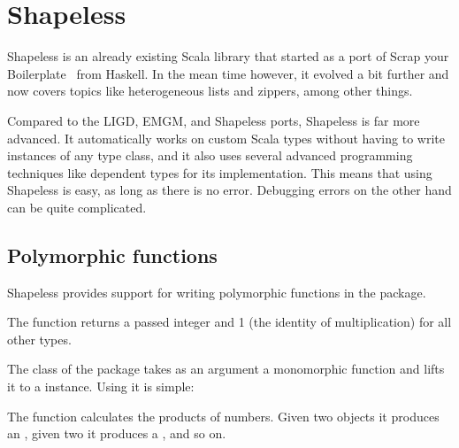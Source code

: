 \section{Shapeless}
\label{shapeless}

Shapeless is an already existing Scala library that started as a port of Scrap your
Boilerplate~\cite{DBLP:conf/tldi/LammelJ03} from Haskell. In the mean time however,
it evolved a bit further and now covers topics like heterogeneous lists and
zippers, among other things.

Compared to the LIGD, EMGM, and Shapeless ports, Shapeless is far more
advanced. It automatically works on custom Scala types without having to
write instances of any type class, and it also uses several advanced programming
techniques like dependent types for its implementation. This means that using
Shapeless is easy, as long as there is no error. Debugging errors on the other
hand can be quite complicated.

\subsection{Polymorphic functions}
Shapeless provides support for writing polymorphic functions in the
 package.

\begin{example}
  The function  returns a passed integer and 1 (the identity of
  multiplication) for all other types.

  
\end{example}

\begin{example}
  The class \cd{->} of the  package takes as an argument a monomorphic function
  and lifts it to a  instance. Using it is simple:

  
\end{example}

\begin{example}
  The function  calculates the products of numbers. Given two 
  objects it produces an , given two  it produces a ,
  and so on.
  
\end{example}

